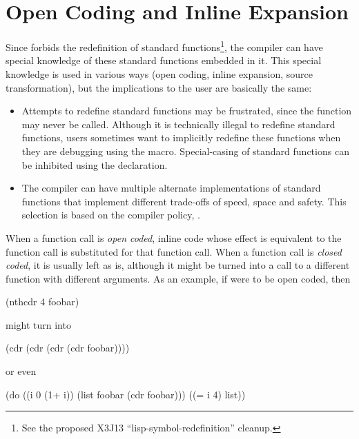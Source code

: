 \section{Open Coding and Inline Expansion}
\label{open-coding}

Since \clisp{} forbids the redefinition of standard functions\footnote{See the
proposed X3J13 ``lisp-symbol-redefinition'' cleanup.}, the compiler can have
special knowledge of these standard functions embedded in it.  This special
knowledge is used in various ways (open coding, inline expansion, source
transformation), but the implications to the user are basically the same:
\begin{itemize}
  
\item Attempts to redefine standard functions may be frustrated, since
  the function may never be called.  Although it is technically
  illegal to redefine standard functions, users sometimes want to
  implicitly redefine these functions when they are debugging using
  the  macro.  Special-casing of standard functions can be
  inhibited using the  declaration.
  
\item The compiler can have multiple alternate implementations of
  standard functions that implement different trade-offs of speed,
  space and safety.  This selection is based on the compiler policy,
  .
\end{itemize}


When a function call is {\em open coded}, inline code whose effect is
equivalent to the function call is substituted for that function call.
When a function call is {\em closed coded}, it is usually left as is,
although it might be turned into a call to a different function with
different arguments.  As an example, if  were to be open
coded, then

\begin{lisp}
(nthcdr 4 foobar)
\end{lisp}

might turn into

\begin{lisp}
(cdr (cdr (cdr (cdr foobar))))
\end{lisp}

or even 

\begin{lisp}
(do ((i 0 (1+ i))
     (list foobar (cdr foobar)))
    ((= i 4) list))
\end{lisp}

